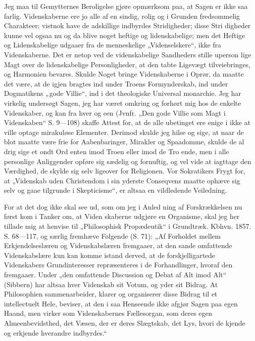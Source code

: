 \documentclass[12pt]{book}
\newcommand{\opage}[1]{\marginnote{\footnotesize\textit{[#1]}}}
\begin{document}
Jeg maa til Gemytternes Beroligelse gjøre opmærksom
paa, at Sagen er ikke saa farlig. Videnskaberne ere jo alle
af en sindig, rolig og i Grunden fredsommelig Charakteer;
vistnok have de adskillige indbyrdes Stridigheder; disse Stri\-%
digheder kunne vel ogsaa nu og da blive noget heftige og
lidenskabelige; men det Heftige og Lidenskabelige udgaaer
fra de menneskelige „Videnselskere“, ikke fra Videnskaberne.
Det er netop ved de videnskabelige Sandheders stille uperson\-%
lige Magt over de lidenskabelige Personligheder, at den tabte
Ligevægt tilveiebringes, og Harmonien bevares. Skulde Noget
bringe Videnskaberne i Oprør, da maatte det være, at de
igjen bragtes ind under Troens Formynderskab, ind under
\opage{318}\setcounter{footnote}{0}%
Dogmatikens „gode Villie“, ind i det theologiske Universal\-%
monarchie. Jeg har virkelig undersøgt Sagen, jeg har været
omkring og forhørt mig hos de enkelte Videnskaber, og kan fra
hver og een (Jvnfr. „Den gode Villie som Magt i Videnskaben“
S. 9---108) skaffe Attest for, at de alle ubetinget ere enige i
ikke at ville optage mirakuløse Elementer. Derimod skulde
jeg hilse og sige, at naar de blot maatte være frie for
Aabenbaringer, Mirakler og Spaadomme, skulde de al\-%
drig sige et ondt Ord enten imod Troen eller imod de Tro\-%
ende, men i alle personlige Anliggender opføre sig sædelig og
fornuftig, og vel vide at iagttage den Værdighed, de skylde
sig selv ligeover for Religionen. Vor Sokratikers Frygt for,
at „Videnskab uden Christendom i sin yderste Conseqvens
maatte ophæve sig selv og gaae tilgrunde i Skepticisme“, er
altsaa en vildledende Veiledning.

For at det dog ikke skal see ud, som om jeg i Anled\-%
ning af Forskrækkelsen nu først kom i Tanker om, at Viden\-%
skaberne udgjøre en Organisme, skal jeg her tillade mig at
henvise til „Philosophisk Propædeutik“ i Grundtræk. Kbhvn.
1857. S. 68---117, og særlig fremhæve Følgende (S. 71):
„Af Forholdet mellem Erkjendelseslæren og Videnskabslæren
fremgaaer, at den sande omfattende Videnskabslære kun kan
komme istand derved, at de forskjelligartede Videnskabers
Grundinteresser repræsenteres i de Forhandlinger, hvoraf den
fremgaaer. Under „den omfattende Discussion og Debat af
Alt imod Alt“ (Sibbern) har altsaa hver Videnskab sit Votum,
og yder sit Bidrag. At Philosophien sammenarbeider, klarer
og organiserer disse Bidrag til et intellectuelt Hele, beviser,
at den i saa Henseende ikke afgjør Sagen paa egen Haand,
men virker som Videnskabernes Fællesorgan, som deres egen
Almeenbevidsthed, det Væsen, der er deres Slægtskab, det
Lys, hvori de kjende og erkjende hverandre indbyrdes.“
\end{document}
